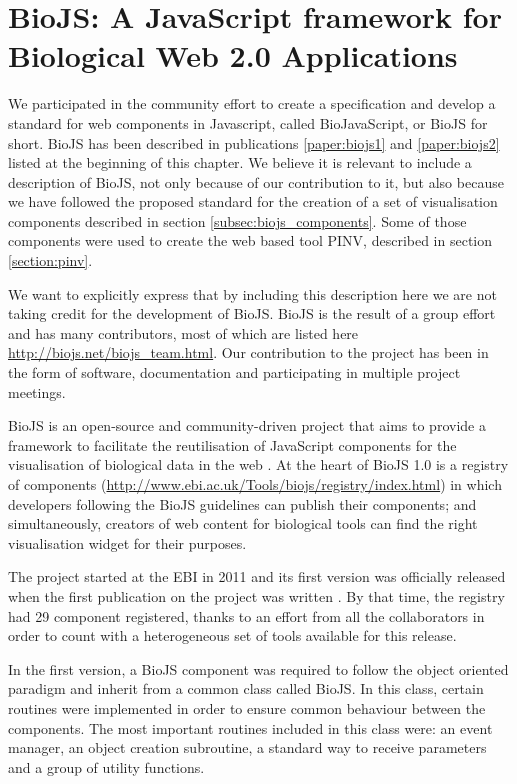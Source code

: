 \section{BioJS: A JavaScript framework for Biological Web 2.0 Applications }
We participated in the community effort to create a specification and develop a standard for web components in Javascript, called BioJavaScript, or BioJS for short. BioJS has been described in publications \ref{paper:biojs1} and \ref{paper:biojs2} listed at the beginning of this chapter. We believe it is relevant to include a description of BioJS, not only because of our contribution to it, but also because we have followed the proposed standard for the creation of a set of visualisation components described in  section \ref{subsec:biojs_components}. Some of those components were used to create the web based tool PINV, described in section \ref{section:pinv}.

We want to explicitly express that by including this description here we are not taking credit for the development of BioJS. BioJS is the result of a group effort and has many contributors, most of which are listed here \url{http://biojs.net/biojs_team.html}. Our contribution to the project has been in the form of software, documentation and participating in multiple project meetings.

BioJS is an open-source and community-driven project that aims to provide a framework to facilitate the reutilisation of JavaScript components for the visualisation of biological data in the web \cite{GOM2013}. At the heart of BioJS 1.0 is a registry of components (\url{http://www.ebi.ac.uk/Tools/biojs/registry/index.html}) in which developers following the BioJS guidelines can publish their components; and simultaneously, creators of web content for biological tools can find the right visualisation widget for their purposes.

The project started at the EBI in 2011 and its first version was officially released when the first publication on the project was written \cite{GOM2013}. By that time, the registry had 29 component registered, thanks to an effort from all the collaborators in order to count with a heterogeneous set of tools available for this release.

In the first version, a BioJS component was required to follow the object oriented paradigm and inherit from a common class called BioJS. In this class, certain routines were implemented in order to ensure common behaviour between the components. The most important routines included in this class were: an event manager, an object creation subroutine, a standard way to receive parameters and a group of utility functions.


